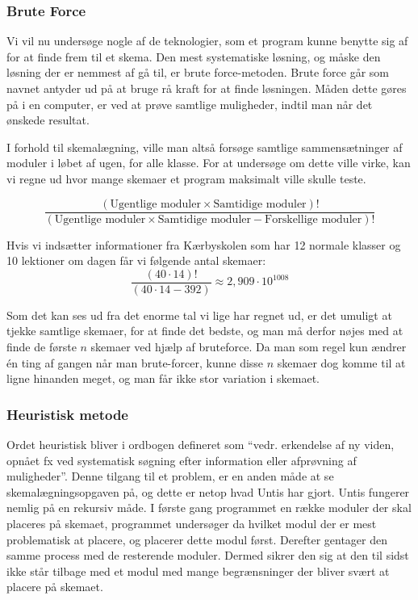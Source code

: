 \subsubsection{Brute Force}
Vi vil nu undersøge nogle af de teknologier, som et program kunne benytte sig af for at finde frem til et skema. Den mest systematiske løsning, og måske den løsning der er nemmest af gå til, er brute force-metoden. Brute force går som navnet antyder ud på at bruge rå kraft for at finde løsningen. Måden dette gøres på i en computer, er ved at prøve samtlige muligheder, indtil man når det ønskede resultat\cite{BruteForce}.

I forhold til skemalægning, ville man altså forsøge samtlige sammensætninger af moduler i løbet af ugen, for alle klasse. For at undersøge om dette ville virke, kan vi regne ud hvor mange skemaer et program maksimalt ville skulle teste.

$$ \frac{(\text{Ugentlige moduler} \times \text{Samtidige moduler})!}{(\text{Ugentlige moduler} \times \text{Samtidige moduler} - \text{Forskellige moduler})!} $$

Hvis vi indsætter informationer fra Kærbyskolen som har 12 normale klasser og 10 lektioner om dagen får vi følgende antal skemaer:
$$ \frac{(40 \cdot 14)!}{(40 \cdot 14 - 392)} \approx 2,909\cdot 10^{1008} $$

Som det kan ses ud fra det enorme tal vi lige har regnet ud, er det umuligt at tjekke samtlige skemaer, for at finde det bedste, og man må derfor nøjes med at finde de første $n$ skemaer ved hjælp af bruteforce. Da man som regel kun ændrer \'en ting af gangen når man brute-forcer, kunne disse $n$ skemaer dog komme til at ligne hinanden meget, og man får ikke stor variation i skemaet.

\subsubsection{Heuristisk metode}
Ordet heuristisk bliver i ordbogen defineret som ``vedr. erkendelse af ny viden, opnået fx ved systematisk søgning efter information eller afprøvning af muligheder''\cite{Ordnet}. Denne tilgang til et problem, er en anden måde at se skemalægningsopgaven på, og dette er netop hvad Untis har gjort\cite[s.~27]{UntisBeskrivelse}. Untis fungerer nemlig på en rekursiv måde. I første gang programmet en række moduler der skal placeres på skemaet, programmet undersøger da hvilket modul der er mest problematisk at placere, og placerer dette modul først. Derefter gentager den samme process med de resterende moduler. Dermed sikrer den sig at den til sidst ikke står tilbage med et modul med mange begrænsninger der bliver svært at placere på skemaet. 


